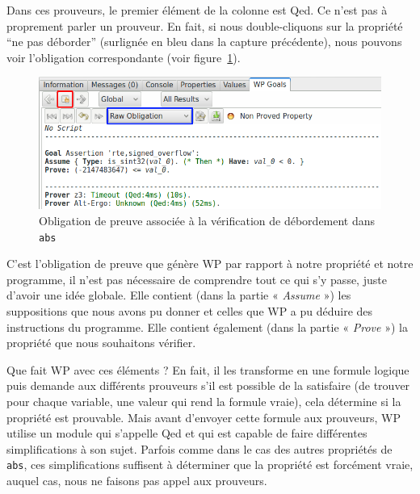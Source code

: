 \documentclass[12pt,francais,]{scrbook}
\begin{document}
Dans ces prouveurs, le premier élément de la colonne est Qed. Ce n'est
pas à proprement parler un prouveur. En fait, si nous double-cliquons
sur la propriété ``ne pas déborder'' (surlignée en bleu dans la capture
précédente), nous pouvons voir l'obligation correspondante (voir
figure~\ref{fig:2-1-1-abs-6}).

\begin{figure}[htbp]
\centering
\includegraphics[scale=0.5]{2-1-1-abs-6.png}
\caption{Obligation de preuve associée à la vérification de débordement
dans \texttt{abs}}
\label{fig:2-1-1-abs-6}
\end{figure}


C'est l'obligation de preuve que génère WP par rapport à notre propriété
et notre programme, il n'est pas nécessaire de comprendre tout ce qui
s'y passe, juste d'avoir une idée globale. Elle contient (dans la partie
« \emph{Assume} ») les suppositions que nous avons pu donner et celles
que WP a pu déduire des instructions du programme. Elle contient
également (dans la partie « \emph{Prove} ») la propriété que nous
souhaitons vérifier.

Que fait WP avec ces éléments ? En fait, il les transforme en une
formule logique puis demande aux différents prouveurs s'il est possible
de la satisfaire (de trouver pour chaque variable, une valeur qui rend
la formule vraie), cela détermine si la propriété est prouvable. Mais
avant d'envoyer cette formule aux prouveurs, WP utilise un module qui
s'appelle Qed et qui est capable de faire différentes simplifications à
son sujet. Parfois comme dans le cas des autres propriétés de
\texttt{abs}, ces simplifications suffisent à déterminer que la
propriété est forcément vraie, auquel cas, nous ne faisons pas appel aux
prouveurs.
\end{document}
